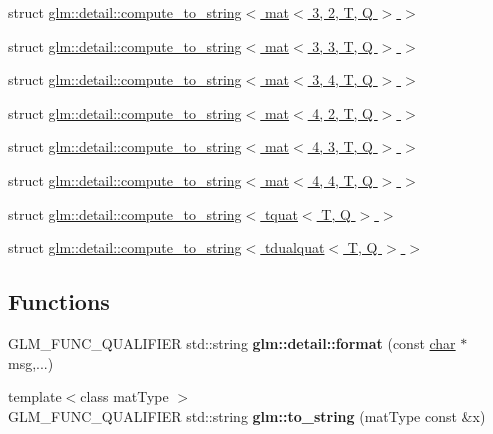 \begin{DoxyCompactItemize}
\item 
struct \hyperlink{structglm_1_1detail_1_1compute__to__string_3_01mat_3_013_00_012_00_01T_00_01Q_01_4_01_4}{glm\+::detail\+::compute\+\_\+to\+\_\+string$<$ mat$<$ 3, 2, T, Q $>$ $>$}
\item 
struct \hyperlink{structglm_1_1detail_1_1compute__to__string_3_01mat_3_013_00_013_00_01T_00_01Q_01_4_01_4}{glm\+::detail\+::compute\+\_\+to\+\_\+string$<$ mat$<$ 3, 3, T, Q $>$ $>$}
\item 
struct \hyperlink{structglm_1_1detail_1_1compute__to__string_3_01mat_3_013_00_014_00_01T_00_01Q_01_4_01_4}{glm\+::detail\+::compute\+\_\+to\+\_\+string$<$ mat$<$ 3, 4, T, Q $>$ $>$}
\item 
struct \hyperlink{structglm_1_1detail_1_1compute__to__string_3_01mat_3_014_00_012_00_01T_00_01Q_01_4_01_4}{glm\+::detail\+::compute\+\_\+to\+\_\+string$<$ mat$<$ 4, 2, T, Q $>$ $>$}
\item 
struct \hyperlink{structglm_1_1detail_1_1compute__to__string_3_01mat_3_014_00_013_00_01T_00_01Q_01_4_01_4}{glm\+::detail\+::compute\+\_\+to\+\_\+string$<$ mat$<$ 4, 3, T, Q $>$ $>$}
\item 
struct \hyperlink{structglm_1_1detail_1_1compute__to__string_3_01mat_3_014_00_014_00_01T_00_01Q_01_4_01_4}{glm\+::detail\+::compute\+\_\+to\+\_\+string$<$ mat$<$ 4, 4, T, Q $>$ $>$}
\item 
struct \hyperlink{structglm_1_1detail_1_1compute__to__string_3_01tquat_3_01T_00_01Q_01_4_01_4}{glm\+::detail\+::compute\+\_\+to\+\_\+string$<$ tquat$<$ T, Q $>$ $>$}
\item 
struct \hyperlink{structglm_1_1detail_1_1compute__to__string_3_01tdualquat_3_01T_00_01Q_01_4_01_4}{glm\+::detail\+::compute\+\_\+to\+\_\+string$<$ tdualquat$<$ T, Q $>$ $>$}
\end{DoxyCompactItemize}
\subsection*{Functions}
\begin{DoxyCompactItemize}
\item 
\mbox{\label{string__cast_8inl_acd5305bbd1c5417b1eb770faf8229d14}} 
G\+L\+M\+\_\+\+F\+U\+N\+C\+\_\+\+Q\+U\+A\+L\+I\+F\+I\+ER std\+::string {\bfseries glm\+::detail\+::format} (const \hyperlink{classchar}{char} $\ast$msg,...)
\item 
\mbox{\label{string__cast_8inl_a8e7a49fe8e0b47b1ffe98cc215142c8e}} 
{\footnotesize template$<$class mat\+Type $>$ }\\G\+L\+M\+\_\+\+F\+U\+N\+C\+\_\+\+Q\+U\+A\+L\+I\+F\+I\+ER std\+::string {\bfseries glm\+::to\+\_\+string} (mat\+Type const \&x)
\end{DoxyCompactItemize}
